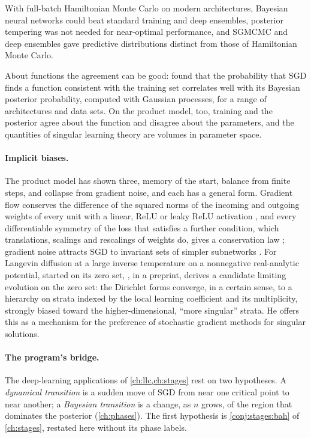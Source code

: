 \begin{refsection}
\begin{observation}
With full-batch Hamiltonian Monte Carlo on modern architectures, Bayesian neural networks could beat standard training and deep ensembles, posterior tempering was not needed for near-optimal performance, and SGMCMC and deep ensembles gave predictive distributions distinct from those of Hamiltonian Monte Carlo.
\end{observation}

About functions the agreement can be good: \textcite{MingardEtAl2021} found that the probability that SGD finds a function consistent with the training set correlates well with its Bayesian posterior probability, computed with Gaussian processes, for a range of architectures and data sets. On the product model, too, training and the posterior agree about the function and disagree about the parameters, and the quantities of singular learning theory are volumes in parameter space.

\paragraph{Implicit biases.} The product model has shown three, memory of the start, balance from finite steps, and collapse from gradient noise, and each has a general form. Gradient flow conserves the difference of the squared norms of the incoming and outgoing weights of every unit with a linear, ReLU or leaky ReLU activation \parencite[Theorem~2.1]{DuEtAl2018}, and every differentiable symmetry of the loss that satisfies a further condition, which translations, scalings and rescalings of weights do, gives a conservation law \parencite[Theorem~1]{KuninEtAl2021}; gradient noise attracts SGD to invariant sets of simpler subnetworks \parencite{ChenEtAl2023b}. For Langevin diffusion at a large inverse temperature on a nonnegative real-analytic potential, started on its zero set, \textcite{Larsson2026}, in a preprint, derives a candidate limiting evolution on the zero set: the Dirichlet forms converge, in a certain sense, to a hierarchy on strata indexed by the local learning coefficient and its multiplicity, strongly biased toward the higher-dimensional, ``more singular'' strata. He offers this as a mechanism for the preference of stochastic gradient methods for singular solutions.

\paragraph{The program's bridge.} The deep-learning applications of \cref{ch:llc,ch:stages} rest on two hypotheses. A \emph{dynamical transition} is a sudden move of SGD from near one critical point to near another; a \emph{Bayesian transition} is a change, as $n$ grows, of the region that dominates the posterior (\cref{ch:phases}). The first hypothesis is \cref{conj:stages:bah} of \cref{ch:stages}, restated here without its phase labels.


\end{refsection}
